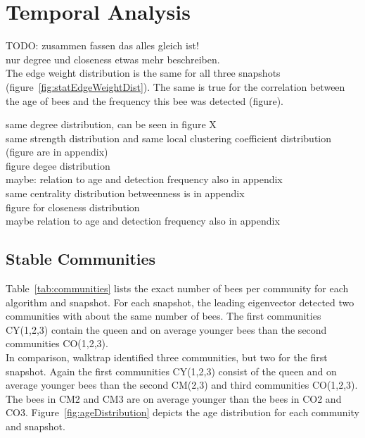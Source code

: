 \section{Temporal Analysis}

TODO: zusammen fassen das alles gleich ist!\\
nur degree und closeness etwas mehr beschreiben.\\
The edge weight distribution is the same for all three snapshots (figure~\ref{fig:statEdgeWeightDist}).
The same is true for the correlation between the age of bees and the frequency this bee was detected (figure).


same degree distribution, can be seen in figure X\\
same strength distribution and same local clustering coefficient distribution (figure are in appendix)\\
figure degee distribution\\
maybe: relation to age and detection frequency also in appendix\\



same centrality distribution betweenness is in appendix\\
figure for closeness distribution\\
maybe relation to age and detection frequency also in appendix\\



\subsection{Stable Communities}
Table~\ref{tab:communities} lists the exact number of bees per community for each algorithm and snapshot.
For each snapshot, the leading eigenvector detected two communities with about the same number of bees.
The first communities CY(1,2,3) contain the queen and on average younger bees than the second communities CO(1,2,3).\\
In comparison, walktrap identified three communities, but two for the first snapshot.
Again the first communities CY(1,2,3) consist of the queen and on average younger bees than the second CM(2,3) and third communities CO(1,2,3).
The bees in CM2 and CM3 are on average younger than the bees in CO2 and CO3.
Figure~\ref{fig:ageDistribution} depicts the age distribution for each community and snapshot.

